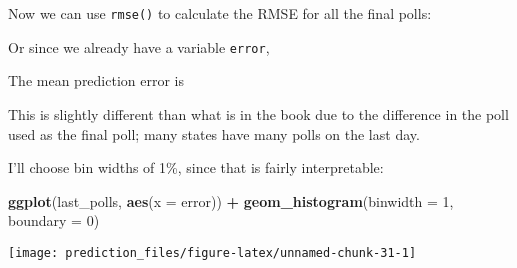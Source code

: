 \documentclass[]{book}
\newenvironment{Shaded}{\begin{snugshade}}{\end{snugshade}}
\newcommand{\CommentTok}[1]{\textcolor[rgb]{0.56,0.35,0.01}{\textit{#1}}}
\newcommand{\DataTypeTok}[1]{\textcolor[rgb]{0.13,0.29,0.53}{#1}}
\newcommand{\DecValTok}[1]{\textcolor[rgb]{0.00,0.00,0.81}{#1}}
\newcommand{\KeywordTok}[1]{\textcolor[rgb]{0.13,0.29,0.53}{\textbf{#1}}}
\newcommand{\NormalTok}[1]{#1}
\newcommand{\OperatorTok}[1]{\textcolor[rgb]{0.81,0.36,0.00}{\textbf{#1}}}
\newcommand{\StringTok}[1]{\textcolor[rgb]{0.31,0.60,0.02}{#1}}
\theoremstyle{definition}
\theoremstyle{definition}
\theoremstyle{definition}
\theoremstyle{remark}
\begin{document}
Now we can use \texttt{rmse()} to calculate the RMSE for all the final
polls:

\begin{Shaded}
\end{Shaded}

Or since we already have a variable \texttt{error},

\begin{Shaded}
\end{Shaded}

The mean prediction error is

\begin{Shaded}
\end{Shaded}

This is slightly different than what is in the book due to the
difference in the poll used as the final poll; many states have many
polls on the last day.

I'll choose bin widths of 1\%, since that is fairly interpretable:

\begin{Shaded}
\begin{Highlighting}[]
\KeywordTok{ggplot}\NormalTok{(last_polls, }\KeywordTok{aes}\NormalTok{(}\DataTypeTok{x =}\NormalTok{ error)) }\OperatorTok{+}
\StringTok{  }\KeywordTok{geom_histogram}\NormalTok{(}\DataTypeTok{binwidth =} \DecValTok{1}\NormalTok{, }\DataTypeTok{boundary =} \DecValTok{0}\NormalTok{)}
\end{Highlighting}
\end{Shaded}

\begin{center}\texttt{[image: prediction\_files/figure-latex/unnamed-chunk-31-1]} \end{center}
\end{document}
